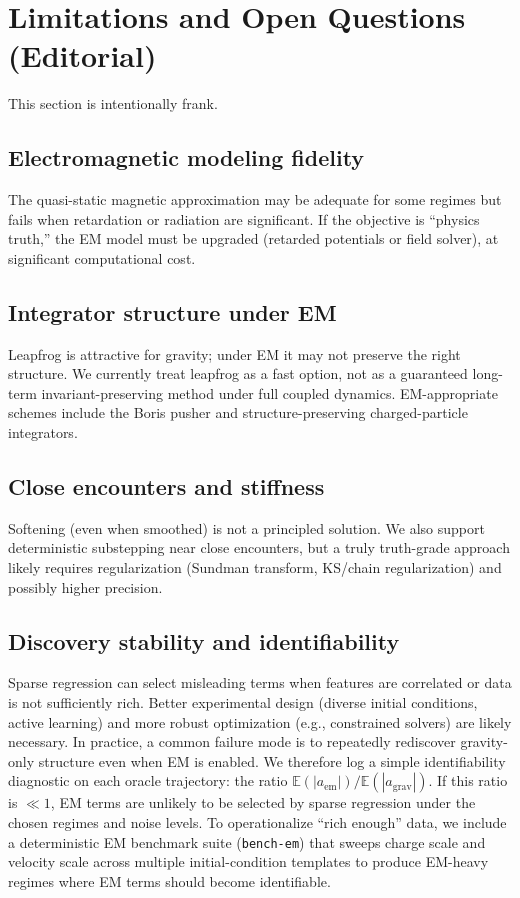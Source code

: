 \documentclass[11pt]{article}
\begin{document}
\section{Limitations and Open Questions (Editorial)}
This section is intentionally frank.

\subsection*{Electromagnetic modeling fidelity}
The quasi-static magnetic approximation may be adequate for some regimes but fails when retardation or radiation are significant. If the objective is ``physics truth,'' the EM model must be upgraded (retarded potentials or field solver), at significant computational cost.

\subsection*{Integrator structure under EM}
Leapfrog is attractive for gravity; under EM it may not preserve the right structure. We currently treat leapfrog as a fast option, not as a guaranteed long-term invariant-preserving method under full coupled dynamics. EM-appropriate schemes include the Boris pusher and structure-preserving charged-particle integrators.\cite{Boris1970,He2015,HigueraCary2017}

\subsection*{Close encounters and stiffness}
Softening (even when smoothed) is not a principled solution. We also support deterministic substepping near close encounters, but a truly truth-grade approach likely requires regularization (Sundman transform, KS/chain regularization) and possibly higher precision.

\subsection*{Discovery stability and identifiability}
Sparse regression can select misleading terms when features are correlated or data is not sufficiently rich. Better experimental design (diverse initial conditions, active learning) and more robust optimization (e.g., constrained solvers) are likely necessary.
In practice, a common failure mode is to repeatedly rediscover gravity-only structure even when EM is enabled. We therefore log a simple identifiability diagnostic on each oracle trajectory: the ratio $\mathbb{E}(|a_{\mathrm{em}}|)/\mathbb{E}(|a_{\mathrm{grav}}|)$. If this ratio is $\ll 1$, EM terms are unlikely to be selected by sparse regression under the chosen regimes and noise levels. To operationalize ``rich enough'' data, we include a deterministic EM benchmark suite (\texttt{bench-em}) that sweeps charge scale and velocity scale across multiple initial-condition templates to produce EM-heavy regimes where EM terms should become identifiable.
\end{document}
